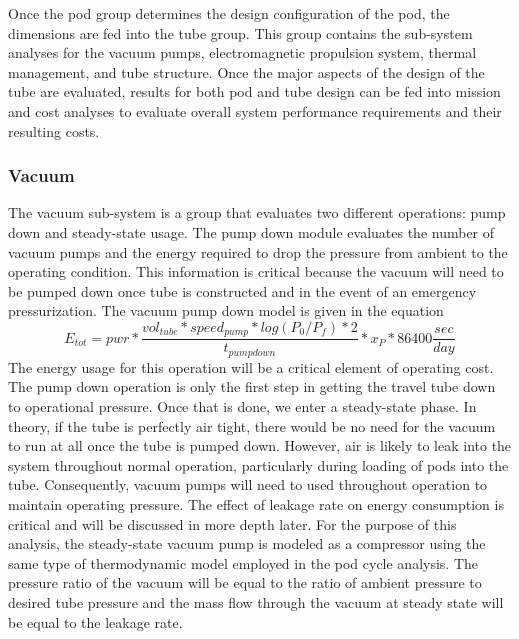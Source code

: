 	Once the pod group determines the design configuration of the pod, the
	dimensions are fed into the tube group. This group contains the sub-system
	analyses for the vacuum pumps, electromagnetic propulsion system, thermal
	management, and tube structure. Once the major aspects of the design of the
	tube are evaluated, results for both pod and tube design can be fed into
	mission and cost analyses to evaluate overall system performance
	requirements and their resulting costs.

\subsubsection{Vacuum}
	The vacuum sub-system is a group that evaluates two different 
	operations: pump down and steady-state usage. The pump down module
	evaluates the number of vacuum pumps and the energy required to drop the pressure
	from ambient to the operating condition. This
	information is critical because the vacuum will need to be pumped down
	once tube is constructed and in the event of an emergency pressurization.
	The vacuum pump down model is given in the equation
	\begin{equation}
		\label{eq:vacuum}
		E_{tot} = pwr * \frac{vol_{tube}*speed_{pump}*log(P_{0}/P_{f})*2}{t_{pumpdown}}* x_{P} * 86400 \frac{sec}{day}
	\end{equation}
	The energy usage for this operation will be a critical element of
	operating cost. The pump down operation is only the first step in getting
	the travel tube down to operational pressure. Once that is done, we enter
	a steady-state phase. In theory, if the tube is perfectly air tight, there
	would be no need for the vacuum to run at all once the tube is pumped
	down. However, air is likely to leak into the system throughout normal
	operation, particularly during loading of pods into the tube.
	Consequently, vacuum pumps will need to used throughout operation to
	maintain operating pressure. The effect of leakage rate on energy
	consumption is critical and will be discussed in more depth later. For the
	purpose of this analysis, the steady-state vacuum pump is modeled as a
	compressor using the same type of thermodynamic model employed in the pod
	cycle analysis. The pressure ratio
	of the vacuum will be equal to the ratio of ambient pressure to desired
	tube pressure and the mass flow through the vacuum at steady state will be
	equal to the leakage rate.
